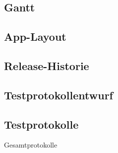 \newpage



\subsection{Gantt}
\begin{landscape}
	
\end{landscape}

\subsection{App-Layout}
\label{subsec:App-Layout}
	
	
\subsection{Release-Historie}
\label{subsec:Release-Historie}
		
	
\subsection{Testprotokollentwurf}
\label{subsec:Testprotokollentwurf}
	
	





	
	
	
	
	


	
\subsection{Testprotokolle}
\label{subsec:Testprotokolle}

\Large{Gesamtprotokolle}


	
